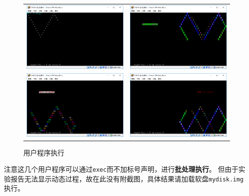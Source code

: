 \documentclass[logo,reportComp]{thesis}
\begin{document}
\begin{figure}[H]
\centering
\begin{tabular}{cc}
\includegraphics[width=0.5\linewidth]{fig/prg1.PNG}&
\includegraphics[width=0.5\linewidth]{fig/prg2.PNG}\\
\includegraphics[width=0.5\linewidth]{fig/prg3.PNG}&
\includegraphics[width=0.5\linewidth]{fig/prg4.PNG}\\
\end{tabular}
\caption{用户程序执行}
\label{fig:execution}
\end{figure}

注意这几个用户程序可以通过\verb'exec'而不加标号声明，进行\textbf{批处理执行}。
但由于实验报告无法显示动态过程，故在此没有附截图，具体结果请加载软盘\verb'mydisk.img'执行。
\end{document}
